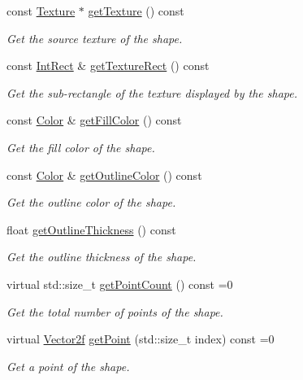 \begin{DoxyCompactItemize}
const \hyperlink{classsf_1_1Texture}{Texture} $\ast$ \hyperlink{classsf_1_1Shape_a06682d37fd38d8fad56afdd5228b6951}{get\+Texture} () const
\begin{DoxyCompactList}\small\item\em Get the source texture of the shape. \end{DoxyCompactList}\item 
const \hyperlink{classsf_1_1Rect}{Int\+Rect} \& \hyperlink{classsf_1_1Shape_ac878aab03c230dc31c44e250d092b9ea}{get\+Texture\+Rect} () const
\begin{DoxyCompactList}\small\item\em Get the sub-\/rectangle of the texture displayed by the shape. \end{DoxyCompactList}\item 
const \hyperlink{classsf_1_1Color}{Color} \& \hyperlink{classsf_1_1Shape_ae3030128824e687f259d18addcf33528}{get\+Fill\+Color} () const
\begin{DoxyCompactList}\small\item\em Get the fill color of the shape. \end{DoxyCompactList}\item 
const \hyperlink{classsf_1_1Color}{Color} \& \hyperlink{classsf_1_1Shape_a6598feed5fea1325a36b0f3a615ac55c}{get\+Outline\+Color} () const
\begin{DoxyCompactList}\small\item\em Get the outline color of the shape. \end{DoxyCompactList}\item 
float \hyperlink{classsf_1_1Shape_a1d4d5299c573a905e5833fc4dce783a7}{get\+Outline\+Thickness} () const
\begin{DoxyCompactList}\small\item\em Get the outline thickness of the shape. \end{DoxyCompactList}\item 
virtual std\+::size\+\_\+t \hyperlink{classsf_1_1Shape_af988dd61a29803fc04d02198e44b5643}{get\+Point\+Count} () const =0
\begin{DoxyCompactList}\small\item\em Get the total number of points of the shape. \end{DoxyCompactList}\item 
virtual \hyperlink{classsf_1_1Vector2}{Vector2f} \hyperlink{classsf_1_1Shape_a40e5d83713eb9f0c999944cf96458085}{get\+Point} (std\+::size\+\_\+t index) const =0
\begin{DoxyCompactList}\small\item\em Get a point of the shape. \end{DoxyCompactList}\item 

\end{DoxyCompactItemize}
